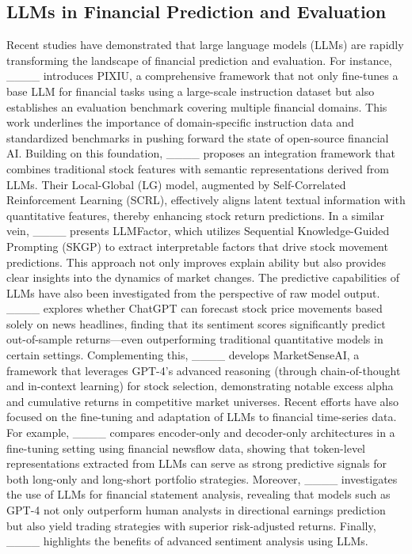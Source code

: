 \subsection{LLMs in Financial Prediction and Evaluation}
Recent studies have demonstrated that large language models (LLMs) are rapidly transforming the landscape of financial prediction and evaluation. For instance, ____ introduces PIXIU, a comprehensive framework that not only fine-tunes a base LLM for financial tasks using a large-scale instruction dataset but also establishes an evaluation benchmark covering multiple financial domains. This work underlines the importance of domain-specific instruction data and standardized benchmarks in pushing forward the state of open-source financial AI. Building on this foundation, ____ proposes an integration framework that combines traditional stock features with semantic representations derived from LLMs. Their Local-Global (LG) model, augmented by Self-Correlated Reinforcement Learning (SCRL), effectively aligns latent textual information with quantitative features, thereby enhancing stock return predictions. In a similar vein, ____ presents LLMFactor, which utilizes Sequential Knowledge-Guided Prompting (SKGP) to extract interpretable factors that drive stock movement predictions. This approach not only improves explain ability but also provides clear insights into the dynamics of market changes. The predictive capabilities of LLMs have also been investigated from the perspective of raw model output. ____ explores whether ChatGPT can forecast stock price movements based solely on news headlines, finding that its sentiment scores significantly predict out-of-sample returns—even outperforming traditional quantitative models in certain settings. Complementing this, ____ develops MarketSenseAI, a framework that leverages GPT-4’s advanced reasoning (through chain-of-thought and in-context learning) for stock selection, demonstrating notable excess alpha and cumulative returns in competitive market universes. Recent efforts have also focused on the fine-tuning and adaptation of LLMs to financial time-series data. For example, ____ compares encoder-only and decoder-only architectures in a fine-tuning setting using financial newsflow data, showing that token-level representations extracted from LLMs can serve as strong predictive signals for both long-only and long-short portfolio strategies. Moreover, ____ investigates the use of LLMs for financial statement analysis, revealing that models such as GPT-4 not only outperform human analysts in directional earnings prediction but also yield trading strategies with superior risk-adjusted returns. Finally, ____ highlights the benefits of advanced sentiment analysis using LLMs. 

